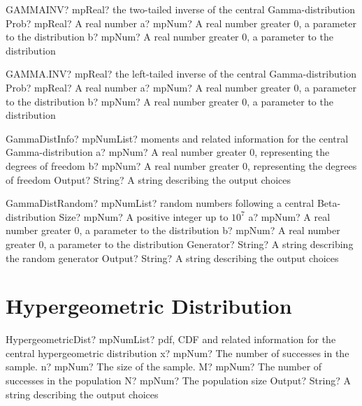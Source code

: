 \documentclass[12pt,a4paper,openany]{book}
\begin{document}
\begin{mpFunctionsExtract}
\mpWorksheetFunctionThreeNotImplemented
{GAMMAINV? mpReal? the two-tailed inverse of the central Gamma-distribution}
{Prob? mpReal? A real number}
{a? mpNum? A real number greater 0, a parameter to the distribution}
{b? mpNum? A real number greater 0, a parameter to the distribution}
\end{mpFunctionsExtract}

\begin{mpFunctionsExtract}
\mpWorksheetFunctionThreeNotImplemented
{GAMMA.INV? mpReal? the left-tailed inverse of the central Gamma-distribution}
{Prob? mpReal? A real number}
{a? mpNum? A real number greater 0, a parameter to the distribution}
{b? mpNum? A real number greater 0, a parameter to the distribution}
\end{mpFunctionsExtract}

\begin{mpFunctionsExtract}
\mpFunctionTwoNotImplemented
{GammaDistInfo? mpNumList? moments and related information for the central Gamma-distribution}
{a? mpNum? A real number greater 0, representing the degrees of freedom}
{b? mpNum? A real number greater 0, representing the degrees of freedom}
{Output? String? A string describing the output choices}
\end{mpFunctionsExtract}

\begin{mpFunctionsExtract}
\mpFunctionFiveNotImplemented
{GammaDistRandom? mpNumList? random numbers following a central Beta-distribution}
{Size? mpNum? A positive integer up to $10^7$}
{a? mpNum? A real number greater 0, a parameter to the distribution}
{b? mpNum? A real number greater 0, a parameter to the distribution}
{Generator? String? A string describing the random generator}
{Output? String? A string describing the output choices}
\end{mpFunctionsExtract}

\section{Hypergeometric Distribution}

\begin{mpFunctionsExtract}
\mpFunctionFiveNotImplemented
{HypergeometricDist? mpNumList? pdf, CDF and related information for the central hypergeometric distribution}
{x? mpNum? The number of successes in the sample.}
{n? mpNum? The size of the sample.}
{M? mpNum? The number of successes in the population}
{N? mpNum? The population size}
{Output? String? A string describing the output choices}
\end{mpFunctionsExtract}
\end{document}
